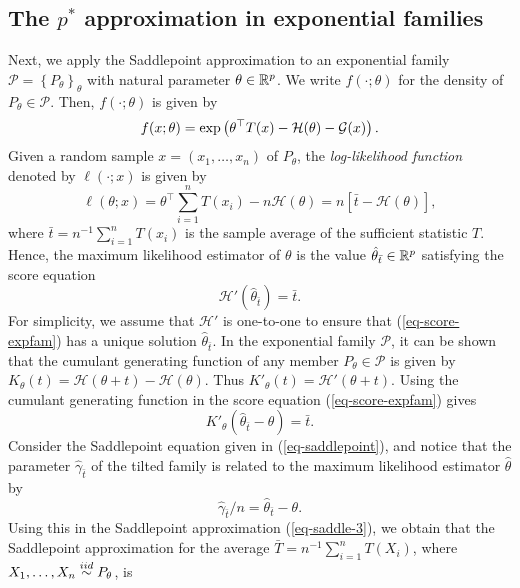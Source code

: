 \subsection{The $p^*$ approximation in exponential families} \label{sec-pstar}

Next, we apply the Saddlepoint approximation to an exponential family $\mathcal{P} = \left\{P_\theta\right\}_{\theta}$ with natural parameter $\theta \in {\mathbb{R}^p}$. We write $f(\cdot; \theta)$ for the density of $P_\theta \in \mathcal{P}$. Then, $f(\cdot; \theta)$ is given by
\begin{equation*}
    f(x; \theta) = \exp\left(\theta^\top T(x) - \mathcal{H}(\theta) - \mathcal{G}(x)\right).
\end{equation*}
Given a random sample $x = (x_1, \ldots, x_n)$ of $P_\theta$, the \textit{log-likelihood function} denoted by $\ell(\cdot; x)$ is given by
\begin{equation*}
    \ell(\theta; x) = \theta^\top \sum_{i=1}^n T(x_i) - n \mathcal{H}(\theta) = n\left[\bar t - \mathcal{H}(\theta)\right],
\end{equation*}
where $\bar t = n^{-1}\sum_{i=1}^n T(x_i)$ is the sample average of the sufficient statistic $T$. Hence, the maximum likelihood estimator of $\theta$ is the value $\hat\theta_{\bar t} \in {\mathbb{R}^p}$ satisfying the score equation
\begin{equation} \label{eq-score-expfam}
    \mathcal{H}'(\hat\theta_{\bar t}) = \bar t.
\end{equation}
For simplicity, we assume that $\mathcal{H}'$ is one-to-one to ensure that (\ref{eq-score-expfam}) has a unique solution $\hat\theta_{\bar t}$. In the exponential family $\mathcal{P}$, it can be shown that the cumulant generating function of any member $P_\theta \in \mathcal{P}$ is given by $K_\theta(t) = \mathcal{H}(\theta + t) - \mathcal{H}(\theta)$. Thus $K'_\theta(t) = \mathcal{H}'(\theta + t)$. Using the cumulant generating function in the score equation (\ref{eq-score-expfam}) gives
\begin{equation*}
    K'_\theta(\hat\theta_{\bar t} - \theta) = \bar t.
\end{equation*}
Consider the Saddlepoint equation given in (\ref{eq-saddlepoint}), and notice that the parameter $\hat\gamma_{\bar t}$ of the tilted family is related to the maximum likelihood estimator $\hat\theta$ by
\begin{equation*}
    \hat\gamma_{\bar t}/n = \hat\theta_{\bar t} - \theta.
\end{equation*}
Using this in the Saddlepoint approximation (\ref{eq-saddle-3}), we obtain that the Saddlepoint approximation for the average $\bar T = n^{-1}\sum_{i=1}^n T(X_i)$, where $X_1, \ldots, X_n \stackrel{iid}{\sim} P_\theta$, is

